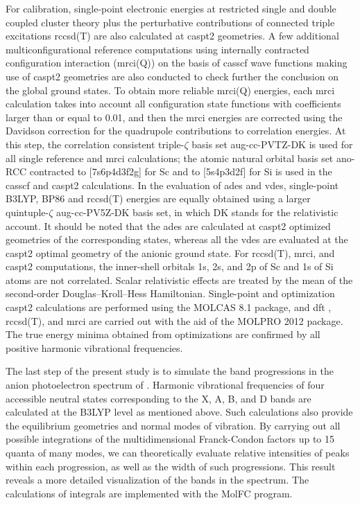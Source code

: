 \begin{refsection}
For calibration, single-point electronic energies at restricted single and double coupled cluster theory plus the perturbative contributions of connected triple excitations \acrshort{rccsd}(T) are also calculated at \acrshort{caspt2} geometries. A few additional multiconfigurational reference computations using internally contracted configuration interaction (\acrshort{mrci}(Q)) on the basis of \acrshort{casscf} wave functions making use of \acrshort{caspt2} geometries are also conducted to check further the conclusion on the global ground states. To obtain more reliable \acrshort{mrci}(Q) energies, each \acrshort{mrci} calculation takes into account all configuration state functions with coefficients larger than or equal to 0.01, and then the \acrshort{mrci} energies are corrected using the Davidson correction for the quadrupole contributions to correlation energies. At this step, the correlation consistent triple-$\zeta$ basis set aug-cc-PVTZ-DK is used for all single reference and \acrshort{mrci} calculations; the atomic natural orbital basis set \acrshort{ano}-RCC contracted to [7s6p4d3f2g]\cite{c3:41} for Sc and to [5s4p3d2f]\cite{c3:42} for Si is used in the \acrshort{casscf} and \acrshort{caspt2} calculations. In the evaluation of \acrshort{ade}s and \acrshort{vde}s, single-point B3LYP, BP86 and \acrshort{rccsd}(T) energies are equally obtained using a larger quintuple-$\zeta$ aug-cc-PV5Z-DK basis set,\cite{c3:37, c3:38} in which DK stands for the relativistic account. It should be noted that the \acrshort{ade}s are calculated at \acrshort{caspt2} optimized geometries of the corresponding states, whereas all the \acrshort{vde}s are evaluated at the \acrshort{caspt2} optimal geometry of the anionic ground state. For \acrshort{rccsd}(T), \acrshort{mrci}, and \acrshort{caspt2} computations, the inner-shell orbitals 1s, 2s, and 2p of Sc and 1s of Si atoms are not correlated. Scalar relativistic effects are treated by the mean of the second-order Douglas–Kroll–Hess Hamiltonian.\cite{c3:43} Single-point and optimization \acrshort{caspt2} calculations are performed using the MOLCAS 8.1 package,\cite{c3:44} and \acrshort{dft} , \acrshort{rccsd}(T), and \acrshort{mrci} are carried out with the aid of the MOLPRO 2012 package.\cite{c3:45} The true energy minima obtained from optimizations are confirmed by all positive harmonic vibrational frequencies. 




The last step of the present study is to simulate the band progressions in the anion photoelectron spectrum of . Harmonic vibrational frequencies of four accessible neutral states corresponding to the X, A, B, and D bands are calculated at the B3LYP level as mentioned above. Such calculations also provide the equilibrium geometries and normal modes of vibration. By carrying out all possible integrations of the multidimensional Franck-Condon factors up to 15 quanta of many modes, we can theoretically evaluate relative intensities of peaks within each progression, as well as the width of such progressions. This result reveals a more detailed visualization of the bands in the spectrum. The calculations of integrals are implemented with the MolFC program.\cite{c3:46}




\end{refsection}
